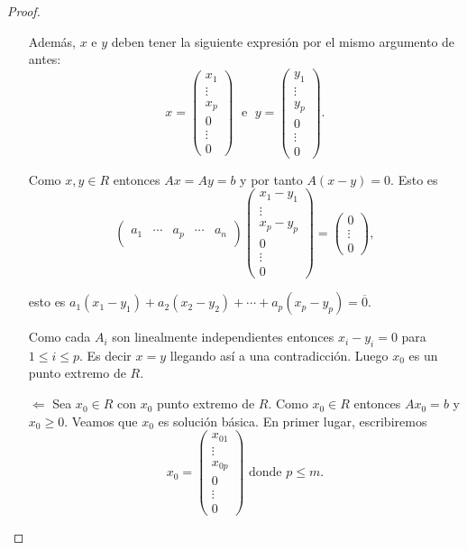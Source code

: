 \begin{proof}
\begin{enumerate}
    Además, $x$ e $y$ deben tener la siguiente expresión por el mismo argumento de antes:
    $$x=\left(
      \begin{array}{c}
        x_{1}\\ \vdots \\x_{p}\\ 0 \\ \vdots \\ 0
      \end{array}\right)\; \text{ e }\;
    y=\left(
      \begin{array}{c}
        y_{1}\\ \vdots \\y_{p}\\ 0 \\ \vdots \\ 0
      \end{array}
    \right).$$
    
    Como $x,y\in R$ entonces $Ax=Ay=b$ y por tanto $A(x-y)=0$. Esto es
    $$\left(
      \begin{array}{ccccc}
        & & & &\\
        a_1 &\cdots & a_p &\cdots & a_n\\
        & & & &
      \end{array}
    \right)
    \left(
      \begin{array}{c}
        x_1-y_1\\
        \vdots\\
        x_p-y_p\\
        0\\
        \vdots\\
        0
      \end{array}
    \right)
    =
    \left(
      \begin{array}{c}
        0\\
        \vdots\\
        0
      \end{array}
    \right),$$
		
    esto es $a_1(x_1-y_1)+a_2(x_2-y_2)+\cdots+a_p(x_p-y_p)=\overline{0}$.
    
    Como cada $A_i$ son linealmente independientes entonces $x_i-y_i=0$ para $1\le i \le p$. Es decir $x=y$ llegando así a una contradicción. Luego $x_0$ es un punto extremo de $R$.
    
    \item[$\Longleftarrow$] Sea $x_0\in R$ con $x_0$ punto extremo de $R$. Como $x_0\in R$ entonces $Ax_0=b$ y $x_0\ge0$. Veamos que $x_0$ es solución básica. En primer lugar, escribiremos
    $$x_0=\left(
      \begin{array}{c}
        x_{01}\\ \vdots \\x_{0p}\\ 0 \\ \vdots \\ 0
      \end{array}\right) \text{ donde $p\le m$.}$$
		

\end{enumerate}
\end{proof}
